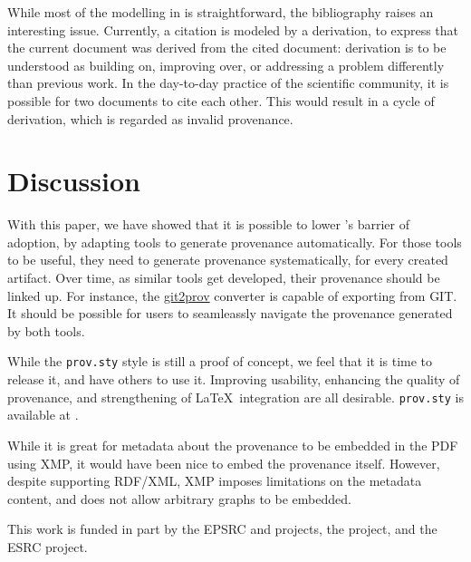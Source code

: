 \documentclass{sigplanconf}
\newcommand{\provsty}{{\tt prov.sty}\xspace}
\begin{document}
While most of the modelling in \PROV is straightforward, the
bibliography raises an interesting issue. Currently, a citation is
modeled by a \PROV derivation, to express that the current document
was derived from the cited document: derivation is to be understood as
building on, improving over, or addressing a problem differently than
previous work.  In the day-to-day practice of the scientific
community, it is possible for two documents to cite each other. This
would result in a cycle of derivation, which is regarded as invalid
provenance.

\section{Discussion}

With this paper, we have showed that it is possible to lower \PROV's
barrier of adoption, by adapting tools to generate provenance
automatically.  For those tools to be useful, they need to generate
provenance systematically, for every created artifact. Over time, as
similar tools get developed, their provenance should be linked up. For
instance, the \href{http://git2prov.org/}{git2prov} converter is
capable of exporting \PROV from GIT.  It should be possible for users
to seamleassly navigate the provenance generated by both tools.

While the \provsty style is still a proof of concept, we feel that it
is time to release it, and have others to use it.  Improving
usability, enhancing the quality of provenance, and strengthening of
\LaTeX\ integration are all desirable.  \provsty is available at
\provstyurl.

While it is great for metadata about the provenance to be embedded in
the PDF using XMP, it would have been nice to embed the provenance
itself. However, despite supporting RDF/XML, XMP imposes limitations
on the metadata content, and does not allow arbitrary \PROV graphs to
be embedded.




\acks

This work is funded in part by the EPSRC  and
 projects, 
the  project,
and the ESRC 
 project.  




\provBibliography






\provEmbed
\end{document}
